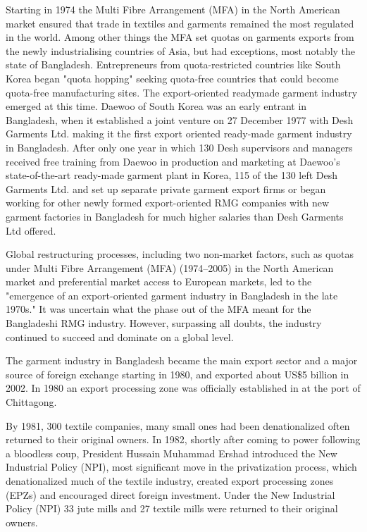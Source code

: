 \documentclass[conference]{IEEEtran}
\begin{document}
Starting in 1974 the Multi Fibre Arrangement (MFA) in the North American market ensured that trade in textiles and garments remained the most regulated in the world. Among other things the MFA set quotas on garments exports from the newly industrialising countries of Asia, but had exceptions, most notably the state of Bangladesh. Entrepreneurs from quota-restricted countries like South Korea began "quota hopping" seeking quota-free countries that could become quota-free manufacturing sites. The export-oriented readymade garment industry emerged at this time. Daewoo of South Korea was an early entrant in Bangladesh, when it established a joint venture on 27 December 1977 with Desh Garments Ltd. making it the first export oriented ready-made garment industry in Bangladesh. After only one year in which 130 Desh supervisors and managers received free training from Daewoo in production and marketing at Daewoo's state-of-the-art ready-made garment plant in Korea, 115 of the 130 left Desh Garments Ltd. and set up separate private garment export firms or began working for other newly formed export-oriented RMG companies with new garment factories in Bangladesh for much higher salaries than Desh Garments Ltd offered.

Global restructuring processes, including two non-market factors, such as quotas under Multi Fibre Arrangement (MFA) (1974–2005) in the North American market and preferential market access to European markets, led to the "emergence of an export-oriented garment industry in Bangladesh in the late 1970s." It was uncertain what the phase out of the MFA meant for the Bangladeshi RMG industry. However, surpassing all doubts, the industry continued to succeed and dominate on a global level.

The garment industry in Bangladesh became the main export sector and a major source of foreign exchange starting in 1980, and exported about US\$5 billion in 2002. In 1980 an export processing zone was officially established in at the port of Chittagong.

By 1981, 300 textile companies, many small ones had been denationalized often returned to their original owners. In 1982, shortly after coming to power following a bloodless coup, President Hussain Muhammad Ershad introduced the New Industrial Policy (NPI), most significant move in the privatization process, which denationalized much of the textile industry, created export processing zones (EPZs) and encouraged direct foreign investment. Under the New Industrial Policy (NPI) 33 jute mills and 27 textile mills were returned to their original owners.
\end{document}
